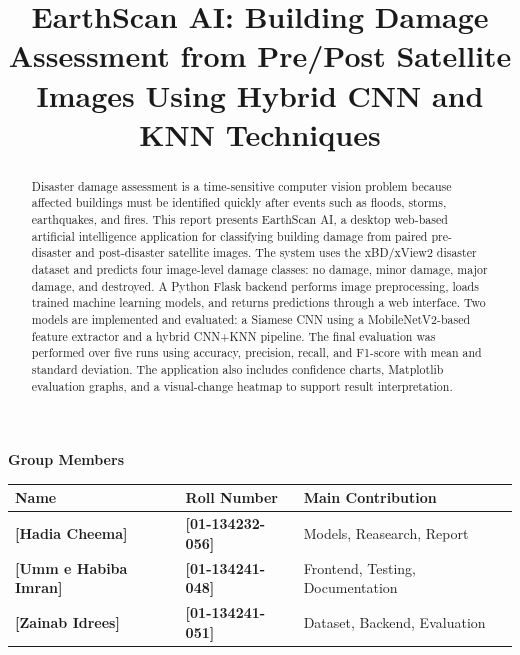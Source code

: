 \documentclass[conference]{IEEEtran}
\begin{document}
\begin{titlepage}
    \vspace{1.05cm}
    {\large \textbf{Group Members}\par}
    \vspace{0.28cm}
    \renewcommand{\arraystretch}{1.25}
    \begin{tabular}{p{4.2cm}p{3.1cm}p{4.7cm}}
        \toprule
        \textbf{Name} & \textbf{Roll Number} & \textbf{Main Contribution} \\
        \midrule
        \textbf{[Hadia Cheema]} & \textbf{[01-134232-056]} & Models, Reasearch, Report \\
        \textbf{[Umm e Habiba Imran]} & \textbf{[01-134241-048]} & Frontend, Testing, Documentation \\
        \textbf{[Zainab Idrees]} & \textbf{[01-134241-051]} & Dataset, Backend, Evaluation \\
        \bottomrule
    \end{tabular}
    \renewcommand{\arraystretch}{1.0}


\end{titlepage}

\title{\LARGE \textbf{EarthScan AI: Building Damage Assessment from Pre/Post Satellite Images Using Hybrid CNN and KNN Techniques}}


\maketitle

\begin{abstract}
Disaster damage assessment is a time-sensitive computer vision problem because affected buildings must be identified quickly after events such as floods, storms, earthquakes, and fires. This report presents EarthScan AI, a desktop web-based artificial intelligence application for classifying building damage from paired pre-disaster and post-disaster satellite images. The system uses the xBD/xView2 disaster dataset and predicts four image-level damage classes: no damage, minor damage, major damage, and destroyed. A Python Flask backend performs image preprocessing, loads trained machine learning models, and returns predictions through a web interface. Two models are implemented and evaluated: a Siamese CNN using a MobileNetV2-based feature extractor and a hybrid CNN+KNN pipeline. The final evaluation was performed over five runs using accuracy, precision, recall, and F1-score with mean and standard deviation. The application also includes confidence charts, Matplotlib evaluation graphs, and a visual-change heatmap to support result interpretation.
\end{abstract}
\end{document}
